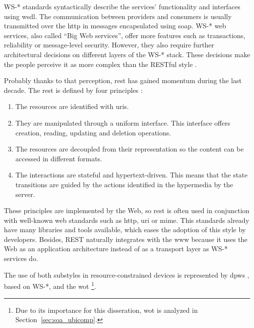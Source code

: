 WS-* standards syntactically describe the services' functionality and interfaces using \ac{wsdl}.
The communication between providers and consumers is usually transmitted over the \ac{http} in messages encapsulated using \ac{soap}.
WS-* web services, also called ``Big Web services'', offer more features such as transactions, reliability or message-level security.
However, they also require further architectural decisions on different layers of the WS-* stack.
These decisions make the people perceive it as more complex than the RESTful style \citep{guinard_search_2011}.


Probably thanks to that perception, \ac{rest} has gained momentum during the last decade. %
The \acl{rest} is defined by four principles \citep{fielding_architectural_2000}:
\begin{enumerate}
  \item The resources are identified with \acp{uri}.
  \item They are manipulated through a uniform interface.
	  This interface offers creation, reading, updating and deletion operations.
  \item The resources are decoupled from their representation so the content can be accessed in different formats.
  \item The interactions are stateful and hypertext-driven.
	This means that the state transitions are guided by the actions identified in the hypermedia by the server.
\end{enumerate}

These principles are implemented by the Web,
so \ac{rest}  is often used in conjunction with well-known web standards such as \ac{http}, \ac{uri} or \ac{mime}.
This standards already have many libraries and tools available, which eases the adoption of this style by developers.
Besides, REST naturally integrates with the \ac{www} because it uses the Web as an application architecture instead of as a transport layer as WS-* services do.

\bigskip

The use of both substyles in resource-constrained devices is represented by
\ac{dpws} \citep{moritz_devices_2010}, based on WS-*,
and the \ac{wot} \citep{guinard_internet_2011} \footnote{Due to its importance for this disseration, \ac{wot} is analyzed in Section~\ref{sec:soa_ubicomp}.}. %


